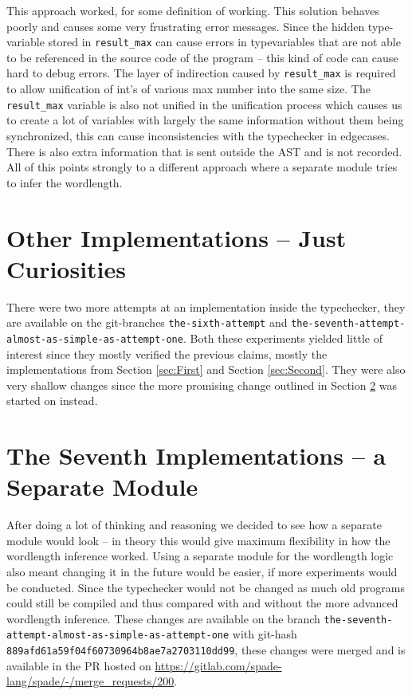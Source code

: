 This approach worked, for some definition of working. This solution behaves poorly and causes some very frustrating error messages. Since the hidden type-variable stored in \verb+result_max+ can cause errors in typevariables that are not able to be referenced in the source code of the program -- this kind of code can cause hard to debug errors. The layer of indirection caused by \verb+result_max+ is required to allow unification of int's of various max number into the same size. The \verb+result_max+ variable is also not unified in the unification process which causes us to create a lot of variables with largely the same information without them being synchronized, this can cause inconsistencies with the typechecker in edgecases. There is also extra information that is sent outside the AST and is not recorded. All of this points strongly to a different approach where a separate module tries to infer the wordlength.

\section{Other Implementations -- Just Curiosities}
\label{sec:Other}
There were two more attempts at an implementation inside the typechecker, they are available on the git-branches \verb+the-sixth-attempt+ and \verb+the-seventh-attempt-almost-as-simple-as-attempt-one+. Both these experiments yielded little of interest since they mostly verified the previous claims, mostly the implementations from Section \ref{sec:First} and Section \ref{sec:Second}. They were also very shallow changes since the more promising change outlined in Section \ref{sec:Seven} was started on instead.


\section{The Seventh Implementations -- a Separate Module}
\label{sec:Seven}
After doing a lot of thinking and reasoning we decided to see how a separate module would look -- in theory this would give maximum flexibility in how the wordlength inference worked. Using a separate module for the wordlength logic also meant changing it in the future would be easier, if more experiments would be conducted. Since the typechecker would not be changed as much old programs could still be compiled and thus compared with and without the more advanced wordlength inference. These changes are available on the branch \verb+the-seventh-attempt-almost-as-simple-as-attempt-one+ with git-hash \verb+889afd61a59f04f60730964b8ae7a2703110dd99+, these changes were merged and is available in the PR hosted on \url{https://gitlab.com/spade-lang/spade/-/merge_requests/200}.

